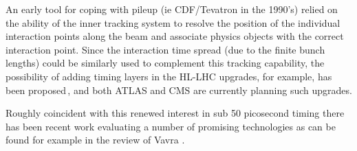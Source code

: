 \documentclass{article}
\begin{document}
An early tool for coping with pileup (ie CDF/Tevatron in the 1990's) relied on the ability of the inner tracking system to resolve the position of the individual interaction points along the beam and associate physics objects with the correct 
interaction point. Since the interaction time spread (due to the finite bunch lengths) could be similarly used to complement this tracking capability, the possibility of adding timing layers in the HL-LHC upgrades, for example, has been proposed\,\cite{CHEF}, and both ATLAS and CMS are currently planning such upgrades.

Roughly coincident with this renewed interest in sub 50 picosecond timing there has been recent work evaluating a number of promising technologies as can be found for example in the review of Vavra \cite{Vavra}.


\end{document}
